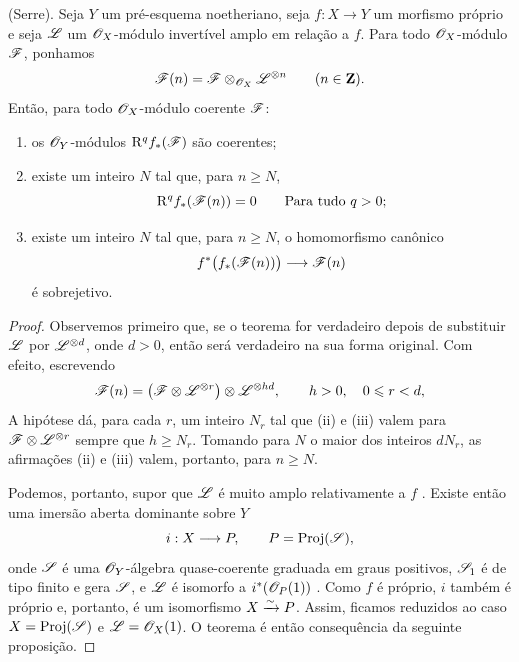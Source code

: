 \begin{theorem}[2.2.1]
\label{III.2.2.1}
(Serre).
Seja $Y$ um pré-esquema noetheriano, seja $f:X\to Y$ um morfismo próprio e seja $\mathscr{L}$ um $\mathscr{O}_X$-módulo invertível amplo em relação a $f$.
Para todo $\mathscr{O}_X$-módulo $\mathscr{F}$, ponhamos
\[
  \mathscr{F}(n)=\mathscr{F}\otimes_{\mathscr{O}_X}\mathscr{L}^{\otimes n}
  \qquad(n\in\mathbf{Z}).
\]
Então, para todo $\mathscr{O}_X$-módulo coerente $\mathscr{F}$:
\begin{enumerate}
  \item[{\rm(i) }] os $\mathscr{O}_Y$-módulos $\mathrm{R}^qf_*(\mathscr{F})$ são coerentes;
  \item[{\rm(ii) }] existe um inteiro $N$ tal que, para $n\geq N$,
  \[
    \mathrm{R}^qf_*(\mathscr{F}(n))=0
    \qquad\text{Para tudo }q>0;
  \]
  \item[{\rm(iii) }] existe um inteiro $N$ tal que, para $n\geq N$, o homomorfismo canônico
  \[
    f^*\bigl(f_*(\mathscr{F}(n))\bigr)\longrightarrow\mathscr{F}(n)
  \]
  é sobrejetivo.
\end{enumerate}
\end{theorem}

\begin{proof}
Observemos primeiro que, se o teorema for verdadeiro depois de substituir $\mathscr{L}$ por $\mathscr{L}^{\otimes d}$, onde $d>0$, então será verdadeiro na sua forma original.
Com efeito, escrevendo
\[
  \mathscr{F}(n)
  =\bigl(\mathscr{F}\otimes\mathscr{L}^{\otimes r}\bigr)
   \otimes\mathscr{L}^{\otimes hd},
   \qquad h>0,\quad 0\leqslant r<d,
\]
A hipótese dá, para cada $r$, um inteiro $N_r$ tal que (ii) e (iii) valem para $\mathscr{F}\otimes\mathscr{L}^{\otimes r}$ sempre que $h\geq N_r$.
Tomando para $N$ o maior dos inteiros $dN_r$, as afirmações (ii) e (iii) valem, portanto, para $n\geq N$.

Podemos, portanto, supor que $\mathscr{L}$ é muito amplo relativamente a $f$ .
Existe então uma imersão aberta dominante sobre $Y$
\[
  i:X\longrightarrow P,
  \qquad P=\operatorname{Proj}(\mathscr{S}),
\]
onde $\mathscr{S}$ é uma $\mathscr{O}_Y$-álgebra quase-coerente graduada em graus positivos, $\mathscr{S}_1$ é de tipo finito e gera $\mathscr{S}$, e $\mathscr{L}$ é isomorfo a $i^*(\mathscr{O}_P(1))$ .
Como $f$ é próprio, $i$ também é próprio  e, portanto, é um isomorfismo $X\xrightarrow{\sim} P$.
Assim, ficamos reduzidos ao caso $X=\operatorname{Proj}(\mathscr{S})$ e $\mathscr{L}=\mathscr{O}_X(1)$.
O teorema é então consequência da seguinte proposição.
\end{proof}

